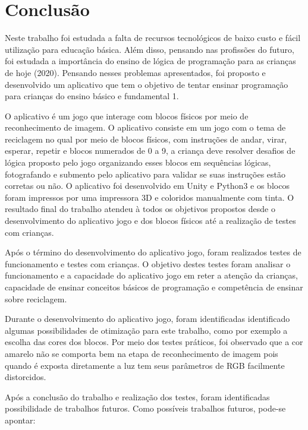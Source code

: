 \chapter{Conclusão}\label{cap:conclusão}

Neste trabalho foi estudada a falta de recursos tecnológicos de baixo custo e fácil utilização para educação básica. Além disso, pensando nas profissões do futuro, foi estudada a importância do ensino de lógica de programação para as crianças de hoje (2020).
Pensando nesses problemas apresentados, foi proposto e desenvolvido um aplicativo que tem o objetivo de tentar ensinar programação para crianças do ensino básico e fundamental 1. 

O aplicativo é um jogo que interage com blocos físicos por meio de reconhecimento de imagem. O aplicativo consiste em um jogo com o tema de reciclagem no qual por meio de blocos físicos, com instruções de andar, virar, esperar, repetir e blocos numerados de 0 a 9, a criança deve resolver desafios de lógica proposto pelo jogo organizando esses blocos em sequências lógicas, fotografando e submento pelo aplicativo para validar se suas instruções estão corretas ou não. O aplicativo foi desenvolvido em Unity e Python3 e os blocos foram impressos por uma impressora 3D e coloridos manualmente com tinta. O resultado final do trabalho atendeu à todos os objetivos propostos desde o desenvolvimento do aplicativo jogo e dos blocos físicos até a realização de testes com crianças.

Após o término do desenvolvimento do aplicativo jogo, foram realizados testes de funcionamento e testes com crianças. O objetivo destes testes foram analisar o funcionamento e a capacidade do aplicativo jogo em reter a atenção da crianças, capacidade de ensinar conceitos básicos de programação e competência de ensinar sobre reciclagem.

Durante o desenvolvimento do aplicativo jogo, foram identificadas identificado algumas possibilidades de otimização para este trabalho, como por exemplo a escolha das cores dos blocos. Por meio dos testes práticos, foi observado que a cor amarelo não se comporta bem na etapa de reconhecimento de imagem pois quando é exposta diretamente a luz tem seus parâmetros de RGB facilmente distorcidos.

Após a conclusão do trabalho e realização dos testes, foram identificadas possibilidade de trabalhos futuros. Como possíveis trabalhos futuros, pode-se apontar:

